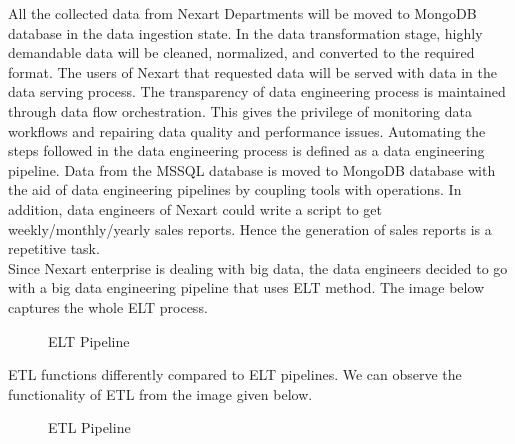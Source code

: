 \documentclass[a4Paper,12pt]{report}
\begin{document}
All the collected data from Nexart Departments will be moved to MongoDB database in the data ingestion state. In the data transformation stage, highly demandable data will be cleaned, normalized, and converted to the required format. The users of Nexart that requested data will be served with data in the data serving process. The transparency of data engineering process is maintained through data flow orchestration. This gives the privilege of monitoring data workflows and repairing data quality and performance issues. Automating the steps followed in the data engineering process is defined as a data engineering pipeline. Data from the MSSQL database is moved to MongoDB database with the aid of data engineering pipelines by coupling tools with operations. In addition, data engineers of Nexart could write a script to get weekly/monthly/yearly sales reports. Hence the generation of sales reports is a repetitive task.\\[12pt]
Since Nexart enterprise is dealing with big data, the data engineers decided to go with a big data engineering pipeline that uses ELT method. The image below captures the whole ELT process.
\begin{figure}[H]
\centering
{}
\caption{ELT Pipeline}
\end{figure}
ETL functions differently compared to ELT pipelines. We can observe the functionality of ETL from the image given below.
\begin{figure}[H]
\centering
{}
\caption{ETL Pipeline}
\end{figure}
\end{document}
